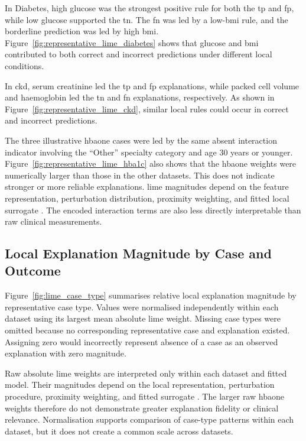 In Diabetes, high glucose was the strongest positive rule for both the \gls{tp} and \gls{fp}, while low glucose supported the \gls{tn}. The \gls{fn} was led by a low-\gls{bmi} rule, and the borderline prediction was led by high \gls{bmi}. Figure~\ref{fig:representative_lime_diabetes} shows that glucose and \gls{bmi} contributed to both correct and incorrect predictions under different local conditions.

In \gls{ckd}, serum creatinine led the \gls{tp} and \gls{fp} explanations, while packed cell volume and haemoglobin led the \gls{tn} and \gls{fn} explanations, respectively. As shown in Figure~\ref{fig:representative_lime_ckd}, similar local rules could occur in correct and incorrect predictions.

The three illustrative \gls{hbaone} cases were led by the same absent interaction indicator involving the ``Other'' specialty category and age 30 years or younger. Figure~\ref{fig:representative_lime_hba1c} also shows that the \gls{hbaone} weights were numerically larger than those in the other datasets. This does not indicate stronger or more reliable explanations. \gls{lime} magnitudes depend on the feature representation, perturbation distribution, proximity weighting, and fitted local surrogate \citep{ribeiro_why_2016}. The encoded interaction terms are also less directly interpretable than raw clinical measurements.

\subsection{Local Explanation Magnitude by Case and Outcome}

Figure~\ref{fig:lime_case_type} summarises relative local explanation magnitude by representative case type. Values were normalised independently within each dataset using its largest mean absolute \gls{lime} weight. Missing case types were omitted because no corresponding representative case and explanation existed. Assigning zero would incorrectly represent absence of a case as an observed explanation with zero magnitude.

Raw absolute \gls{lime} weights are interpreted only within each dataset and fitted model. Their magnitudes depend on the local representation, perturbation procedure, proximity weighting, and fitted surrogate \citep{ribeiro_why_2016}. The larger raw \gls{hbaone} weights therefore do not demonstrate greater explanation fidelity or clinical relevance. Normalisation supports comparison of case-type patterns within each dataset, but it does not create a common scale across datasets.

